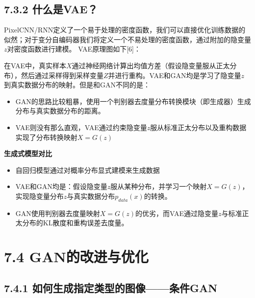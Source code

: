 \subsection{7.3.2 什么是VAE？}\label{ux4ec0ux4e48ux662fvae}

​
PixelCNN/RNN定义了一个易于处理的密度函数，我们可以直接优化训练数据的似然；对于变分自编码器我们将定义一个不易处理的密度函数，通过附加的隐变量\(z\)对密度函数进行建模。
VAE原理图如下{[}6{]}：

\caption{}

​
在VAE中，真实样本\(X\)通过神经网络计算出均值方差（假设隐变量服从正太分布），然后通过采样得到采样变量\(Z\)并进行重构。VAE和GAN均是学习了隐变量\(z\)到真实数据分布的映射。但是和GAN不同的是：

\begin{itemize}
\item
  GAN的思路比较粗暴，使用一个判别器去度量分布转换模块（即生成器）生成分布与真实数据分布的距离。
\item
  VAE则没有那么直观，VAE通过约束隐变量\(z\)服从标准正太分布以及重构数据实现了分布转换映射\(X=G(z)\)
\end{itemize}

\textbf{生成式模型对比}

\begin{itemize}
\item
  自回归模型通过对概率分布显式建模来生成数据
\item
  VAE和GAN均是：假设隐变量\(z\)服从某种分布，并学习一个映射\(X=G(z)\)，实现隐变量分布\(z\)与真实数据分布\(p_{data}(x)\)的转换。
\item
  GAN使用判别器去度量映射\(X=G(z)\)的优劣，而VAE通过隐变量\(z\)与标准正太分布的KL散度和重构误差去度量。
\end{itemize}

\section{7.4
GAN的改进与优化}\label{ganux7684ux6539ux8fdbux4e0eux4f18ux5316}

\subsection{7.4.1
如何生成指定类型的图像------条件GAN}\label{ux5982ux4f55ux751fux6210ux6307ux5b9aux7c7bux578bux7684ux56feux50cfux6761ux4ef6gan}

